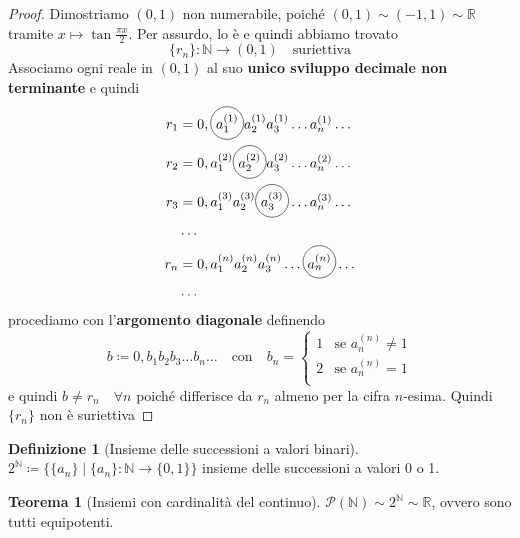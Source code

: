 \documentclass[a4paper,10pt]{article}
\theoremstyle{definition}
\newcommand{\na}{\mathbb{N}} %
\newcommand{\re}{\mathbb{R}} %
\newcommand*\circled[1]{\tikz[baseline=(char.base)]{
  \node[shape=circle,draw,inner sep=1pt] (char) {#1};}} %
\theoremstyle{indentdefinition}
\newtheorem{defn}{Definizione}[section]
\theoremstyle{indentpostulate}
\theoremstyle{indenttheorem}
\newtheorem{thm}{Teorema}[section]
\theoremstyle{myremark}
\theoremstyle{indentgeneral}
\newenvironment{myboxed} 
{\noindent\begin{lrbox}{\mybox}\begin{minipage}{\textwidth}}
{\end{minipage}\end{lrbox}\fbox{\usebox{\mybox}}}
\begin{document}
\begin{proof}
    Dimostriamo $(0,1)$ non numerabile, poiché $(0,1)\sim(-1,1)\sim \re$ tramite $x\mapsto\tan\frac{\pi x}{2}$. Per assurdo, lo è e quindi abbiamo trovato
    $$\{r_n\}:\na\to(0,1)\quad\text{suriettiva}$$
    Associamo ogni reale in $(0,1)$ al suo \textbf{unico sviluppo decimale non terminante} e quindi
    \begin{align*}
        r_1&=0,\circled{${a_1^{(1)}}$}a_2^{(1)}a_3^{(1)}\dots a_n^{(1)}\dots \\
        r_2&=0,a_1^{(2)}\circled{$a_2^{(2)}$}a_3^{(2)}\dots a_n^{(2)}\dots \\
        r_3&=0,a_1^{(3)}a_2^{(3)}\circled{$a_3^{(3)}$}\dots a_n^{(3)}\dots \\
        &\dots \\
        r_n&=0,a_1^{(n)}a_2^{(n)}a_3^{(n)}\dots \circled{$a_n^{(n)}$}\dots \\
        &\dots
    \end{align*}
    procediamo con l'\textbf{argomento diagonale} definendo
    $$b\coloneqq0,b_1b_2b_3\dots b_n\dots\quad \text{con}\quad b_n=\begin{cases}
        1 &\text{se } a_n^{(n)}\ne 1\\
        2 &\text{se } a_n^{(n)}= 1\\
    \end{cases} $$
    e quindi $b\ne r_n\quad\forall n$ poiché differisce da $r_n$ almeno per la cifra $n$-esima. Quindi $\{r_n\}$ non è suriettiva \lightning
\end{proof}

\begin{defn}[Insieme delle successioni a valori binari] $2^\na\coloneqq\{\{a_n\}\mid \{a_n\}:\na\to\{0,1\}\}$ insieme delle successioni a valori 0 o 1.
\end{defn}

\begin{myboxed}
    \begin{thm}[Insiemi con cardinalità del continuo]\label{thm-insiemi-continui}
        $\mathscr{P}(\na)\sim 2^\na\sim\re$, ovvero sono tutti equipotenti.
    \end{thm}
\end{myboxed}
\end{document}

